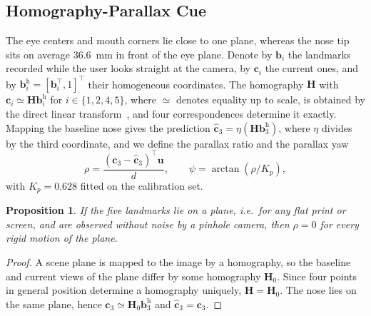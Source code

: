 \documentclass{ieeeaccess}
\newtheorem{proposition}{Proposition}
\begin{document}
\subsection{Homography-Parallax Cue}\label{sec:parallax}
The eye centers and mouth corners lie close to one plane, whereas the nose tip sits on average 36.6~mm in front of the eye plane. Denote by $\mathbf{b}_i$ the landmarks recorded while the user looks straight at the camera, by $\mathbf{c}_i$ the current ones, and by $\mathbf{b}^{\mathrm{h}}_i=[\mathbf{b}_i^\top,1]^\top$ their homogeneous coordinates. The homography $\mathbf{H}$ with $\mathbf{c}_i\simeq\mathbf{H}\mathbf{b}^{\mathrm{h}}_i$ for $i\in\{1,2,4,5\}$, where $\simeq$ denotes equality up to scale, is obtained by the direct linear transform~\cite{hartley2004mvg}, and four correspondences determine it exactly. Mapping the baseline nose gives the prediction $\hat{\mathbf{c}}_3=\eta(\mathbf{H}\mathbf{b}^{\mathrm{h}}_3)$, where $\eta$ divides by the third coordinate, and we define the parallax ratio and the parallax yaw
\begin{equation}
\rho=\frac{(\mathbf{c}_3-\hat{\mathbf{c}}_3)^\top\mathbf{u}}{d},\qquad \psi=\arctan(\rho/K_p),
\end{equation}
with $K_p=0.628$ fitted on the calibration set.

\begin{proposition}
If the five landmarks lie on a plane, i.e.\ for any flat print or screen, and are observed without noise by a pinhole camera, then $\rho=0$ for every rigid motion of the plane.
\end{proposition}
\begin{proof}
A scene plane is mapped to the image by a homography, so the baseline and current views of the plane differ by some homography $\mathbf{H}_0$. Since four points in general position determine a homography uniquely, $\mathbf{H}=\mathbf{H}_0$. The nose lies on the same plane, hence $\mathbf{c}_3\simeq\mathbf{H}_0\mathbf{b}^{\mathrm{h}}_3$ and $\hat{\mathbf{c}}_3=\mathbf{c}_3$.
\end{proof}
\end{document}
